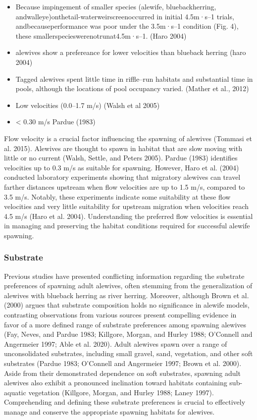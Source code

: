 \documentclass[
]{book}
\begin{document}
\begin{itemize}
\item
  Because impingement of smaller species (alewife, bluebackherring, andwalleye)onthetail-waterweirscreenoccurred in initial 4.5m·s--1 trials, andbecauseperformance was poor under the 3.5m·s--1 condition (Fig. 4), these smallerspecieswerenotrunat4.5m·s--1. (Haro 2004)
\item
  alewives show a prefereance for lower velocities than blueback herring (haro 2004)
\item
  Tagged alewives spent little time in riffle--run habitats and substantial time in pools, although the locations of pool occupancy varied. (Mather et al., 2012)
\item
  Low velocities (0.0--1.7 m/s) (Walsh et al 2005)
\item
  \textless{} 0.30 m/s Pardue (1983)
\end{itemize}

Flow velocity is a crucial factor influencing the spawning of alewives (Tommasi et al. 2015).
Alewives are thought to spawn in habitat that are slow moving with little or no current (Walsh, Settle, and Peters 2005).
Pardue (1983) identifies velocities up to 0.3 m/s as suitable for spawning.
However, Haro et al. (2004) conducted laboratory experiments showing that migratory alewives can travel farther distances upstream when flow velocities are up to 1.5 m/s, compared to 3.5 m/s.
Notably, these experiments indicate some suitability at these flow velocities and very little suitability for upstream migration when velocities reach 4.5 m/s (Haro et al. 2004).
Understanding the preferred flow velocities is essential in managing and preserving the habitat conditions required for successful alewife spawning.

\hypertarget{substrate}{%
\subsubsection{Substrate}\label{substrate}}

Previous studies have presented conflicting information regarding the substrate preferences of spawning adult alewives, often stemming from the generalization of alewives with blueback herring as river herring.
Moreover, although Brown et al. (2000) argues that substrate composition holds no significance in alewife models, contrasting observations from various sources present compelling evidence in favor of a more defined range of substrate preferences among spawning alewives (Fay, Neves, and Pardue 1983; Killgore, Morgan, and Hurley 1988; O'Connell and Angermeier 1997; Able et al. 2020).
Adult alewives spawn over a range of unconsolidated substrates, including small gravel, sand, vegetation, and other soft substrates (Pardue 1983; O'Connell and Angermeier 1997; Brown et al. 2000).
Aside from their demonstrated dependence on soft substrates, spawning adult alewives also exhibit a pronounced inclination toward habitats containing sub-aquatic vegetation (Killgore, Morgan, and Hurley 1988; Laney 1997).
Comprehending and defining these substrate preferences is crucial to effectively manage and conserve the appropriate spawning habitats for alewives.
\end{document}
